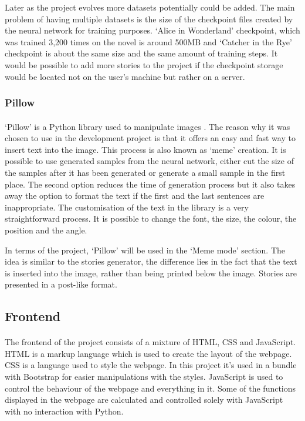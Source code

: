 \documentclass[12pt]{report}
\begin{document}
Later as the project evolves more datasets potentially could be added. The main problem of having multiple datasets is the size of the
checkpoint files created by the neural network for training purposes. `Alice in Wonderland' checkpoint, which was trained 3,200 times on the novel
is around 500MB and `Catcher in the Rye' checkpoint is about the same size and the same amount of training steps. It would be possible to add more stories to the
project if the checkpoint storage would be located not on the user's machine but rather on a server.

\subsubsection*{Pillow}
\paragraph{}
`Pillow' is a Python library used to manipulate images \citep{pillow_lib}. The reason why it was chosen to use in the development project is that it offers an easy and fast way
to insert text into the image. This process is also known as `meme' creation. It is possible to use generated samples
from the neural network, either cut the size of the samples after it has been generated or generate a small sample 
in the first place. The second option reduces the time of generation process but it also takes away the option
to format the text if the first and the last sentences are inappropriate. The customisation of the text in the library
is a very straightforward process. It is possible to change the font, the size, the colour, the position and the angle.

In terms of the project, `Pillow' will be used in the `Meme mode' section. The idea is similar to the stories generator,
the difference lies in the fact that the text is inserted into the image, rather than being printed below the image.
Stories are presented in a post-like format.


\subsection*{Frontend}
\paragraph{}
The frontend of the project consists of a mixture of HTML, CSS and JavaScript. HTML is a markup language which is used
to create the layout of the webpage. CSS is a language used to style the webpage. In this project it's used in a
bundle with Bootstrap for easier manipulations with the styles. JavaScript is used to control the behaviour of
the webpage and everything in it. Some of the functions displayed in the webpage are calculated and controlled 
solely with JavaScript with no interaction with Python.
\end{document}
